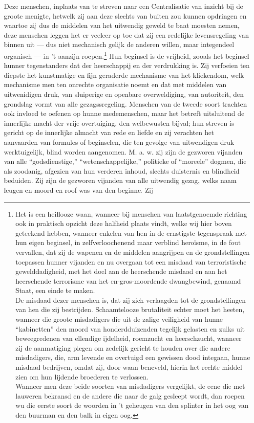 \documentclass[a4paper, 12pt, oneside, dutch]{article}
\begin{document}
Deze menschen, inplaats van te streven naar een Centralisatie van inzicht bij de groote menigte, hetwelk zij aan deze slechts van buiten zou kunnen opdringen en waartoe zij dus de middelen van het uitwendig geweld te baat moesten nemen, deze menschen leggen het er veeleer op toe dat zij een redelijke levensregeling van binnen uit --- dus niet mechanisch gelijk de anderen willen, maar integendeel organisch --- in 't aanzijn roepen.\footnote{Het is een heillooze waan, wanneer bij menschen van laatstgenoemde richting ook in praktisch opzicht deze halfheid plaats vindt, welke wij hier boven geteekend hebben, wanneer enkelen van hen in de ernstigste tegenspraak met hun eigen beginsel, in zelfverloochenend maar verblind heroïsme, in de fout vervallen, dat zij de wapenen en de middelen aangrijpen en de grondstellingen toepassen hunner vijanden en nu overgaan tot een misdaad van terroristische gewelddadigheid, met het doel aan de heerschende misdaad en aan het heerschende terrorisme van het en-gros-moordende dwangbewind, genaamd Staat, een einde te maken.\\\hspace*{5mm}De misdaad dezer menschen is, dat zij zich verlaagden tot de grondstellingen van hen die zij bestrijden. Schaamtelooze brutaliteit echter moet het heeten, wanneer die groote misdadigers die uit de zalige veiligheid van hunne "`kabinetten"' den moord van honderdduizenden tegelijk gelasten en zulks uit beweegredenen van ellendige ijdelheid, roemzucht en heerschzucht, wanneer zij de aanmatiging plegen om zedelijk gericht te houden over die andere misdadigers, die, arm levende en overtuigd een gewissen dood integaan, hunne misdaad bedrijven, omdat zij, door waan beneveld, hierin het rechte middel zien om hun lijdende broederen te verlossen.\\\hspace*{5mm}Wanneer men deze beide soorten van misdadigers vergelijkt, de eene die met lauweren bekransd en de andere die naar de galg gesleept wordt, dan roepen wu die eerste soort de woorden in 't geheugen van den splinter in het oog van den buurman en den balk in eigen oog.} Hun beginsel is de vrijheid, zooals het beginsel hunner tegenstanders dat der heerschappij en der verdrukking is. Zij verfoeien ten diepste het kunstmatige en fijn geraderde mechanisme van het kliekendom, welk mechanisme men ten onrechte organisatie noemt en dat met middelen van uitwenidigen druk, van sluiperige en openbare overweldiging, van autoriteit, den grondslag vormt van alle gezagssregeling. Menschen van de tweede soort trachten ook invloed te oefenen op hunne medemenschen, maar het betreft uitsluitend de innerlijke macht der vrije overtuiging, den welbewusten bijval; hun streven is gericht op de innerlijke almacht van rede en liefde en zij verachten het aanvaarden van formules of beginselen, die ten gevolge van uitwendigen druk werktuigelijk, blind worden aangenomen. M. a. w. zij zijn de gezworen vijanden van alle "`godsdienstige,"' "`wetenschappelijke,"' politieke of "`moreele"' dogmen, die als zoodanig, afgezien van hun verderen inhoud, slechts duisternis en blindheid beduiden. Zij zijn de gezworen vijanden van alle uitwendig gezag, welks naam leugen en moord en roof was van den beginne. Zij 
\end{document}
